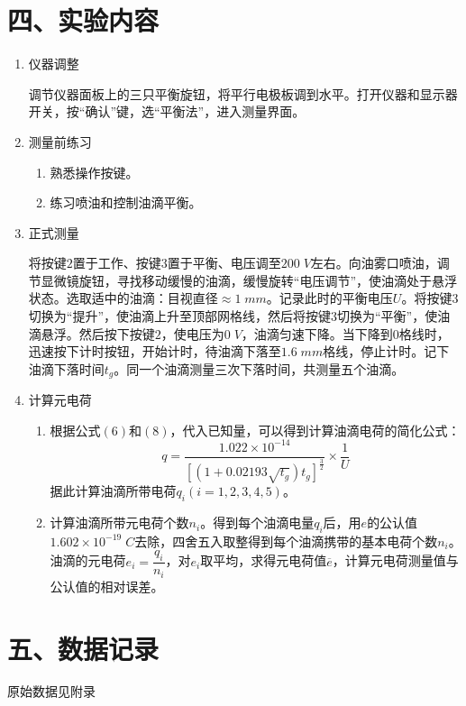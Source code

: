 \documentclass[11pt]{article}
\begin{document}
\section*{四、实验内容}

\begin{enumerate}
    \item 仪器调整
    
    调节仪器面板上的三只平衡旋钮，将平行电极板调到水平。打开仪器和显示器开关，按“确认”键，选“平衡法”，进入测量界面。
    \item 测量前练习
    \begin{enumerate}
        \item 熟悉操作按键。
        \item 练习喷油和控制油滴平衡。
    \end{enumerate}
    \item 正式测量
    
    将按键$2$置于工作、按键$3$置于平衡、电压调至$200\;V$左右。向油雾口喷油，调节显微镜旋钮，寻找移动缓慢的油滴，缓慢旋转“电压调节”，使油滴处于悬浮状态。选取适中的油滴：目视直径$\approx1\;mm$。记录此时的平衡电压$U$。将按键$3$切换为“提升”，使油滴上升至顶部网格线，然后将按键$3$切换为“平衡”，使油滴悬浮。然后按下按键$2$，使电压为$0\;V$，油滴匀速下降。当下降到$0$格线时，迅速按下计时按钮，开始计时，待油滴下落至$1.6\;mm$格线，停止计时。记下油滴下落时间$t_g$。同一个油滴测量三次下落时间，共测量五个油滴。
    \item 计算元电荷
    \begin{enumerate}
        \item 根据公式$(6)$和$(8)$，代入已知量，可以得到计算油滴电荷的简化公式：
        $$
        q=\dfrac{1.022\times10^{-14}}{\left[\left(1+0.02193\sqrt{t_g}\right)t_g\right]^{\frac{3}{2}}}\times\dfrac{1}{U}
        $$
        据此计算油滴所带电荷$q_i(i=1,2,3,4,5)$。
        \item 计算油滴所带元电荷个数$n_i$。得到每个油滴电量$q_i$后，用$e$的公认值$1.602\times10^{-19}\;C$去除，四舍五入取整得到每个油滴携带的基本电荷个数$n_i$。油滴的元电荷$e_i=\dfrac{q_i}{n_i}$，对$e_i$取平均，求得元电荷值$\overline{e}$，计算元电荷测量值与公认值的相对误差。
    \end{enumerate}
\end{enumerate}

\section*{五、数据记录}

原始数据见附录
\end{document}
